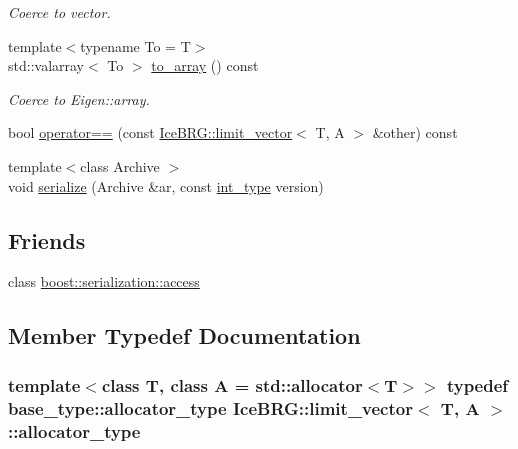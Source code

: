 \begin{DoxyCompactItemize}
\begin{DoxyCompactList}\small\item\em Coerce to vector. \end{DoxyCompactList}\item 
{\footnotesize template$<$typename To  = T$>$ }\\std\+::valarray$<$ To $>$ \hyperlink{classIceBRG_1_1limit__vector_a7e8940e7524a8db501a7496b39c19b56}{to\+\_\+array} () const 
\begin{DoxyCompactList}\small\item\em Coerce to Eigen\+::array. \end{DoxyCompactList}\item 
bool \hyperlink{classIceBRG_1_1limit__vector_ac543b65b10569f4ad956958698269f67}{operator==} (const \hyperlink{classIceBRG_1_1limit__vector}{Ice\+B\+R\+G\+::limit\+\_\+vector}$<$ T, A $>$ \&other) const 
\item 
{\footnotesize template$<$class Archive $>$ }\\void \hyperlink{classIceBRG_1_1limit__vector_aa99a30f3018b8a0916d2597dafbcadca}{serialize} (Archive \&ar, const \hyperlink{lib_2IceBRG__main_2common_8h_ac4de9d9335536ac22821171deec8d39e}{int\+\_\+type} version)
\end{DoxyCompactItemize}
\subsection*{Friends}
\begin{DoxyCompactItemize}
\item 
class \hyperlink{classIceBRG_1_1limit__vector_ac98d07dd8f7b70e16ccb9a01abf56b9c}{boost\+::serialization\+::access}
\end{DoxyCompactItemize}


\subsection{Member Typedef Documentation}
\hypertarget{classIceBRG_1_1limit__vector_ac75a579f04baed676ee916b0ad3dfec0}{}
\subsubsection[{allocator\+\_\+type}]{\setlength{\rightskip}{0pt plus 5cm}template$<$class T, class A = std\+::allocator$<$\+T$>$$>$ typedef base\+\_\+type\+::allocator\+\_\+type {\bf Ice\+B\+R\+G\+::limit\+\_\+vector}$<$ T, A $>$\+::{\bf allocator\+\_\+type}}\label{classIceBRG_1_1limit__vector_ac75a579f04baed676ee916b0ad3dfec0}
\hypertarget{classIceBRG_1_1limit__vector_a8f5c1d622276ed2d9835feab9538b96e}{}
